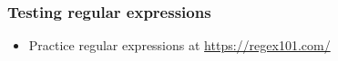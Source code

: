 \documentclass[xcolor=table]{beamer}
\begin{document}
\begin{frame}[fragile]
    \frametitle{Testing regular expressions}
        \begin{itemize}
            \item Practice regular expressions at \url{https://regex101.com/} 
                \begin{center}
                \end{center}
        \end{itemize}
\end{frame}
\end{document}
